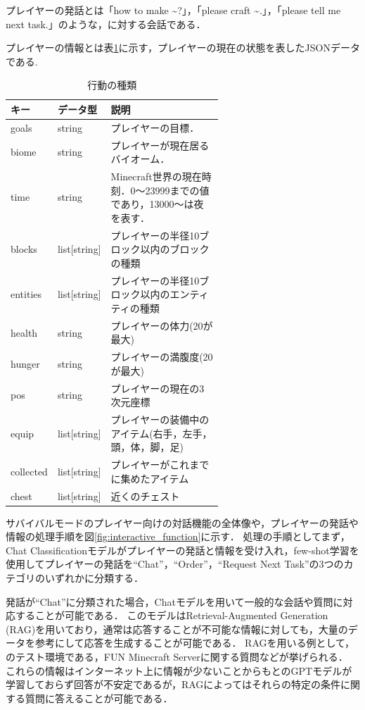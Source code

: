 プレイヤーの発話とは「how to make \textasciitilde?」，「please craft \textasciitilde.」，「please tell me next task.」のような，{\mason}に対する会話である．

プレイヤーの情報とは表\ref{tab:player_data}に示す，プレイヤーの現在の状態を表したJSONデータである.
\begin{table}[H]
    \caption{行動の種類}\label{tab:player_data}
    \centering
    \begin{tabular}{llp{0.6\linewidth}}
        \hline \hline
        キー & データ型 & 説明 \\
        \hline
        goals & string & プレイヤーの目標． \\
        biome & string & プレイヤーが現在居るバイオーム． \\
        time & string & Minecraft世界の現在時刻．0～23999までの値であり，13000～は夜を表す． \\
        blocks & list[string] & プレイヤーの半径10ブロック以内のブロックの種類 \\
        entities & list[string] & プレイヤーの半径10ブロック以内のエンティティの種類 \\
        health & string & プレイヤーの体力(20が最大) \\
        hunger & string & プレイヤーの満腹度(20が最大) \\
        pos & string & プレイヤーの現在の3次元座標 \\
        equip & list[string] & プレイヤーの装備中のアイテム(右手，左手，頭，体，脚，足) \\
        collected & list[string] & プレイヤーがこれまでに集めたアイテム \\
        chest & list[string] & 近くのチェスト \\
        \hline
    \end{tabular}
\end{table}

サバイバルモードのプレイヤー向けの対話機能の全体像や，プレイヤーの発話や情報の処理手順を図\ref{fig:interactive_function}に示す．
処理の手順としてまず，Chat Classificationモデルがプレイヤーの発話と情報を受け入れ，few-shot学習\cite{bib:few-shot}を使用してプレイヤーの発話を``Chat''，``Order''，``Request Next Task''の3つのカテゴリのいずれかに分類する．

発話が``Chat''に分類された場合，Chatモデルを用いて一般的な会話や質問に対応することが可能である．
このモデルはRetrieval-Augmented Generation (RAG)\cite{bib:rag}を用いており，通常は応答することが不可能な情報に対しても，大量のデータを参考にして応答を生成することが可能である．
RAGを用いる例として，{\mason}のテスト環境である，FUN Minecraft Server\cite{bib:fun_minecraft_server}に関する質問などが挙げられる．
これらの情報はインターネット上に情報が少ないことからもとのGPTモデルが学習しておらず回答が不安定であるが，RAGによって{\mason}はそれらの特定の条件に関する質問に答えることが可能である．

